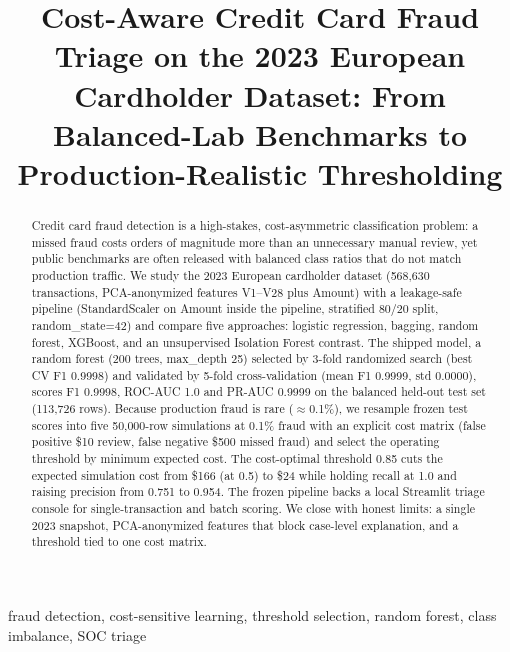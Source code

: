 \documentclass[conference]{IEEEtran}
\begin{document}
\title{Cost-Aware Credit Card Fraud Triage on the 2023 European
Cardholder Dataset: From Balanced-Lab Benchmarks to
Production-Realistic Thresholding}

\author{
}

\maketitle

\begin{abstract}
Credit card fraud detection is a high-stakes, cost-asymmetric
classification problem: a missed fraud costs orders of magnitude more
than an unnecessary manual review, yet public benchmarks are often
released with balanced class ratios that do not match production
traffic. We study the 2023 European cardholder dataset (568,630
transactions, PCA-anonymized features V1--V28 plus Amount) with a
leakage-safe pipeline (StandardScaler on Amount inside the pipeline,
stratified 80/20 split, random\_state=42) and compare five approaches:
logistic regression, bagging, random forest, XGBoost, and an
unsupervised Isolation Forest contrast. The shipped model, a random
forest (200 trees, max\_depth 25) selected by 3-fold randomized search
(best CV F1 0.9998) and validated by 5-fold cross-validation
(mean F1 0.9999, std 0.0000), scores F1 0.9998, ROC-AUC 1.0 and
PR-AUC 0.9999 on the balanced held-out test set (113,726 rows).
Because production fraud is rare ($\approx$0.1\%), we resample frozen
test scores into five 50,000-row simulations at 0.1\% fraud with an
explicit cost matrix (false positive \$10 review, false negative
\$500 missed fraud) and select the operating threshold by minimum
expected cost. The cost-optimal threshold 0.85 cuts the expected
simulation cost from \$166 (at 0.5) to \$24 while holding recall at
1.0 and raising precision from 0.751 to 0.954. The frozen pipeline
backs a local Streamlit triage console for single-transaction and
batch scoring. We close with honest limits: a single 2023 snapshot,
PCA-anonymized features that block case-level explanation, and a
threshold tied to one cost matrix.
\end{abstract}

\begin{IEEEkeywords}
fraud detection, cost-sensitive learning, threshold selection,
random forest, class imbalance, SOC triage
\end{IEEEkeywords}
\end{document}
